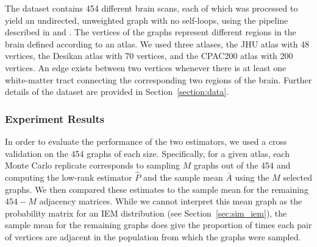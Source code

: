 \documentclass[10pt,letterpaper]{article}
\renewcommand{\hat}{\widehat}
\begin{document}
The dataset contains 454 different brain scans, each of which was processed to yield an undirected, unweighted graph with no self-loops, using the pipeline described in \citet{gray2013migraine} and \citet{kiar2016m2g}.
The vertices of the graphs represent different regions in the brain defined according to an atlas.
We used three atlases, the JHU atlas with 48 vertices, the Desikan atlas with 70 vertices, and the  CPAC200 atlas with 200 vertices.
An edge exists between two vertices whenever there is at least one white-matter tract connecting the corresponding two regions of the brain. 
Further details of the dataset are provided in Section~\ref{section:data}.



\subsubsection{Experiment Results}

In order to evaluate the performance of the two estimators, we used a cross validation on the 454 graphs of each size. 
Specifically, for a given atlas, each Monte Carlo replicate corresponds to sampling $M$ graphs out of the 454 and computing the low-rank estimator $\hat{P}$ and the sample mean $\bar{A}$ using the $M$ selected graphs.
We then compared these estimates to the sample mean for the remaining $454-M$ adjacency matrices.
While we cannot interpret this mean graph as the probability matrix for an IEM distribution (see Section~\ref{sec:sim_iem}), the sample mean for the remaining graphs does give the proportion of times each pair of vertices are adjacent in the population from which the graphs were sampled.
\end{document}
